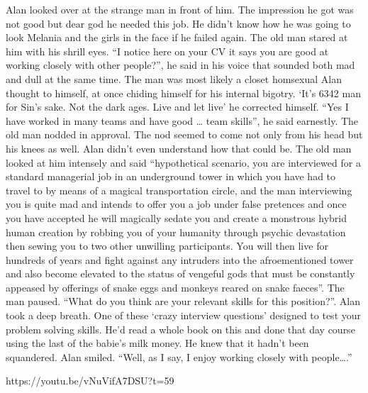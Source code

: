 Alan looked over at the strange man in front of him. The impression he got was not good but dear god he needed this job. He didn’t know how he was going to look Melania and the girls in the face if he failed again. The old man stared at him with his shrill eyes. “I notice here on your CV it says you are good at working closely with other people?”, he said in his voice that sounded both mad and dull at the same time. The man was most likely a closet homsexual Alan thought to himself, at once chiding himself for his internal bigotry. ‘It’s 6342 man for Sin’s sake. Not the dark ages. Live and let live’ he corrected himself. “Yes I have worked in many teams and have good … team skills”, he said earnestly. The old man nodded in approval. The nod seemed to come not only from his head but his knees as well. Alan didn’t even understand how that could be. The old man looked at him intensely and said “hypothetical scenario, you are interviewed for a standard managerial job in an underground tower in which you have had to travel to by means of a magical transportation circle, and the man interviewing you is quite mad and intends to offer you a job under false pretences and once you have accepted he will magically sedate you and create a monstrous hybrid human creation by robbing you of your humanity through psychic devastation then sewing you to two other unwilling participants. You will then live for hundreds of years and fight against any intruders into the afroementioned tower and also become elevated to the status of vengeful gods that must be constantly appeased by offerings of snake eggs and monkeys reared on snake faeces”. The man paused. “What do you think are your relevant skills for this position?”. Alan took a deep breath. One of these ‘crazy interview questions’ designed to test your problem solving skills. He’d read a whole book on this and done that day course using the last of the babie’s milk money. He knew that it hadn’t been squandered. Alan smiled. “Well, as I say, I enjoy working closely with people….”\medskip

https://youtu.be/vNuVifA7DSU?t=59



%

\clearpage